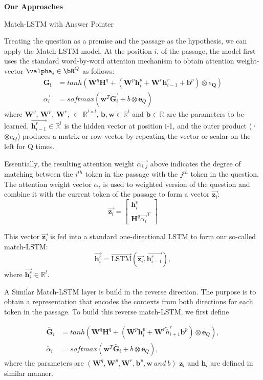 \documentclass{article}
\def\*#1{\mathbf{#1}}
\begin{document}
\begin{psection}{\textbf{Our Approaches}}
\begin{psubsection}{Match-LSTM with Answer Pointer}
\begin{enumerate}[label=\bt{\theenumi.}]
				Treating the question as a premise and the passage as the hypothesis, we can apply the Match-LSTM model. At the position $i$, of the passage, the model first uses the standard word-by-word attention mechanism to obtain attention weight-vector $\valpha_i \in \bR^Q$ as follows:
				\begin{align*}
                \boldsymbol{G_i} &= tanh(\*W^q\*H^q + (\*W^p\*h_i^p+\*W^r\*h_{i-1}^r+\*b^p)\otimes e_{\*Q})\\
                \overrightarrow{\alpha_i} & = softmax(\*w^T\overrightarrow{\*G_i}+b\otimes\*e_Q)
            \end{align*}
            where $\*W^q$, $\*W^p$, $\*W^r$, $\in$ $\mathbb{R}^{l\times l}$, $\*b,\*w \in \mathbb{R}^l$ and $\*b \in \mathbb{R}$ are the parameters to be learned. $\overrightarrow{\*h_{i-1}^{r}} \in \mathbb{R}^l$ is the hidden vector at position i-1, and the
outer product (· $\otimes e_Q$) produces a matrix or row vector by repeating the vector or scalar on the left
for Q times.

Essentially, the resulting attention weight $\overrightarrow{\alpha_{i,j}}$ above indicates the degree of matching between the
$i^{th}$ token in the passage with the $j^{th}$ token in the question. The attention weight vector $\alpha_i$ is used to weighted version of the question and combine it with the current token of the passage to form a vector $\overrightarrow{\*z_i}$:
        $$\overrightarrow{\*z_i} =
            \begin{bmatrix}
                \*h_i^p \\ \*H^q\overrightarrow{\alpha_i}^T
            \end{bmatrix}
        $$

        This vector $\overrightarrow{\*z_i}$ is fed into a standard one-directional LSTM to form our so-called match-LSTM:
        $$\overrightarrow{\*h_i^r} = \overrightarrow{\text{LSTM}}(\overrightarrow{\*z_i},\overrightarrow{\*h_{i-1}^r}),$$
        where $\overrightarrow{\*h_i^r}\in \mathbb{R}^l$.

        A Similar Match-LSTM layer is build in the reverse direction. The purpose is to obtain a representation that encodes the contexts from both directions for each token in the passage. To build this reverse match-LSTM, we first define

        \begin{align*}
             \overleftarrow{\*G_i} &= tanh(\*W^q\*H^q + (\*W^p\*h_i^p + \*W^r\overleftarrow{h}_{i+1}^r\*b^p)\otimes \*e_Q),\\
             \overleftarrow{\alpha_i} & = softmax(\*w^T\overleftarrow{\*G_i}+b\otimes \*e_Q),
        \end{align*}
        where the parameters are $(\*W^q,\*W^p,\*W^r,\*b^p,\*w \ and \ b)$
        $\*z_i$ and $\*h_i$ are defined in similar manner.


\end{enumerate}
\end{psubsection}
\end{psection}
\end{document}
